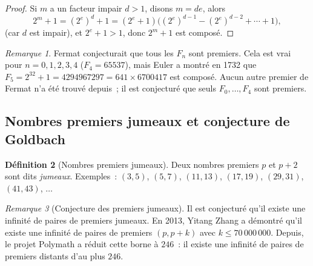 \documentclass[12pt,a4paper,openany]{book}
\theoremstyle{definition}
\newtheorem{definition}{Définition}[chapter]
\theoremstyle{plain}
\theoremstyle{remark}
\newtheorem{remarque}[definition]{Remarque}
\begin{document}
\begin{proof}
Si $m$ a un facteur impair $d > 1$, disons $m = de$, alors
\[
  2^m + 1 = (2^e)^d + 1 = (2^e + 1)\bigl((2^e)^{d-1} - (2^e)^{d-2} + \cdots + 1\bigr),
\]
(car $d$ est impair), et $2^e + 1 > 1$, donc $2^m + 1$ est composé.
\end{proof}

\begin{remarque}
\label{rem:fermat:connus}
Fermat conjecturait que tous les $F_n$ sont premiers. Cela est vrai pour $n = 0, 1,
2, 3, 4$ ($F_4 = 65537$), mais Euler a montré en 1732 que
$F_5 = 2^{32} + 1 = 4294967297 = 641 \times 6700417$ est composé. Aucun autre
premier de Fermat n'a été trouvé depuis~; il est conjecturé que seuls $F_0, \ldots,
F_4$ sont premiers.
\end{remarque}

\subsection{Nombres premiers jumeaux et conjecture de Goldbach}
\label{subsec:ch2:jumeaux_goldbach}

\begin{definition}[Nombres premiers jumeaux]
\label{def:jumeaux}
Deux nombres premiers $p$ et $p+2$ sont dits \emph{jumeaux}. Exemples~: $(3,5)$,
$(5,7)$, $(11,13)$, $(17,19)$, $(29,31)$, $(41,43)$, $\ldots$
\end{definition}

\begin{remarque}[Conjecture des premiers jumeaux]
\label{rem:jumeaux:conjecture}
Il est conjecturé qu'il existe une infinité de paires de premiers jumeaux. En 2013,
Yitang Zhang a démontré qu'il existe une infinité de paires de
premiers $(p, p+k)$ avec $k \leq 70\,000\,000$. Depuis, le projet
Polymath a réduit cette borne à $246$~: il existe une infinité de
paires de premiers distants d'au plus $246$.
\end{remarque}
\end{document}
